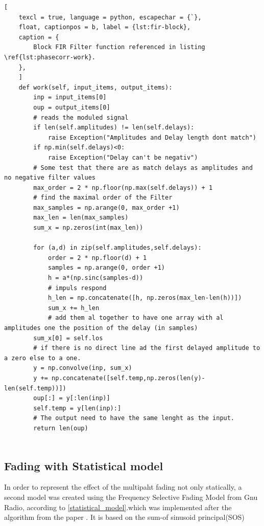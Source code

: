 \begin{lstlisting}[
	texcl = true, language = python, escapechar = {`},
	float, captionpos = b, label = {lst:fir-block},
	caption = {
		Block FIR Filter function referenced in listing \ref{lst:phasecorr-work}.
	},
	]
	def work(self, input_items, output_items):
		inp = input_items[0]
		oup = output_items[0]
		# reads the moduled signal 
		if len(self.amplitudes) != len(self.delays):  
			raise Exception("Amplitudes and Delay length dont match")
		if np.min(self.delays)<0:  
			raise Exception("Delay can't be negativ")
		# Some test that there are as match delays as amplitudes and no negative filter values
		max_order = 2 * np.floor(np.max(self.delays)) + 1 
		# find the maximal order of the Filter
	  	max_samples = np.arange(0, max_order +1) 
		max_len = len(max_samples) 
		sum_x = np.zeros(int(max_len))
	
		for (a,d) in zip(self.amplitudes,self.delays):
			order = 2 * np.floor(d) + 1
			samples = np.arange(0, order +1)  
			h = a*(np.sinc(samples-d)) 
			# impuls respond 
			h_len = np.concatenate([h, np.zeros(max_len-len(h))])
			sum_x += h_len
			# add them al together to have one array with al amplitudes one the position of the delay (in samples)
		sum_x[0] = self.los
		# if there is no direct line ad the first delayed amplitude to a zero else to a one.
		y = np.convolve(inp, sum_x)
		y += np.concatenate([self.temp,np.zeros(len(y)-len(self.temp))])
		oup[:] = y[:len(inp)]
		self.temp = y[len(inp):]   
		# The output need to have the same lenght as the input.     		
		return len(oup)
	
\end{lstlisting}

\subsection{Fading with Statistical model}

	

In order to represent the effect of the multipaht fading not only statically, a second model was created using the Frequency Selective Fading Model from Gnu Radio, according to \ref{statistical_model}.which was implemented after the algorithm from the paper \cite{Alimohammad2009}. It is based on the sum-of sinusoid principal(SOS)

